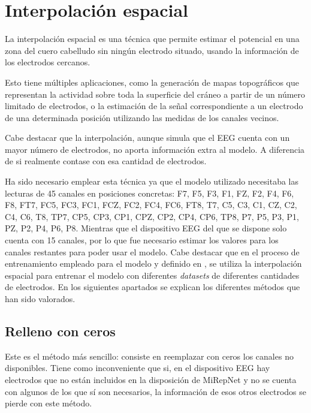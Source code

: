 \section{Interpolación espacial}
\label{sec:interpolación_espacial}

La interpolación espacial es una técnica que permite estimar el potencial en una zona del cuero cabelludo sin ningún electrodo situado, usando la información de los electrodos cercanos. 

Esto tiene múltiples aplicaciones, como la generación de mapas topográficos que representan la actividad sobre toda la superficie del cráneo a partir de un número limitado de electrodos, o la estimación de la señal correspondiente a un electrodo de una determinada posición utilizando las medidas de los canales vecinos. 

Cabe destacar que la interpolación, aunque simula que el EEG cuenta con un mayor número de electrodos, no aporta información extra al modelo. A diferencia de si realmente contase con esa cantidad de electrodos. 

Ha sido necesario emplear esta técnica ya que el modelo utilizado necesitaba las lecturas de 45 canales en posiciones concretas: {F7, F5, F3, F1, FZ, F2, F4, F6, F8, FT7, FC5, FC3, FC1, FCZ, FC2, FC4, FC6, FT8, T7, C5, C3, C1, CZ, C2, C4, C6, T8, TP7, CP5, CP3, CP1, CPZ, CP2, CP4, CP6, TP8, P7, P5, P3, P1, PZ, P2, P4, P6, P8}. Mientras que el dispositivo EEG del que se dispone solo cuenta con 15 canales, por lo que fue necesario estimar los valores para los canales restantes para poder usar el modelo. Cabe destacar que en el proceso de entrenamiento empleado para el modelo y definido en \cite{liu2025mirepnetpipelinefoundationmodel}, se utiliza la interpolación espacial para entrenar el modelo con diferentes \textit{datasets} de diferentes cantidades de electrodos. En los siguientes apartados se explican los diferentes métodos que han sido valorados. 

\subsection{Relleno con ceros}
\label{subsec:interp_ceros}

Este es el método más sencillo: consiste en reemplazar con ceros los canales no disponibles. Tiene como inconveniente que si, en el dispositivo EEG hay electrodos que no están incluidos en la disposición de MiRepNet y no se cuenta con algunos de los que sí son necesarios, la información de esos otros electrodos se pierde con este método.

